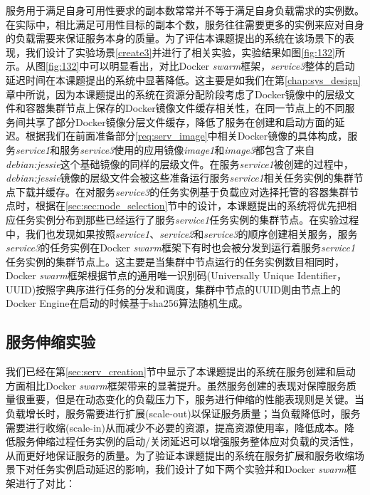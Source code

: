 服务用于满足自身可用性要求的副本数常常并不等于满足自身负载需求的实例数。在实际中，相比满足可用性目标的副本个数，服务往往需要更多的实例来应对自身的负载需要来保证服务本身的质量。为了评估本课题提出的系统在该场景下的表现，我们设计了实验场景\ref{create3}并进行了相关实验，实验结果如图\ref{fig:132}所示。从图\ref{fig:132}中可以明显看出，对比Docker \emph{swarm}框架，\emph{service3}整体的启动延迟时间在本课题提出的系统中显著降低。这主要是如我们在第\ref{chap:sys_design}章中所说，因为本课题提出的系统在资源分配阶段考虑了Docker镜像中的层级文件和容器集群节点上保存的Docker镜像文件缓存相关性，在同一节点上的不同服务间共享了部分Docker镜像分层文件缓存，降低了服务在创建和启动方面的延迟。根据我们在前面准备部分\ref{req:serv_image}中相关Docker镜像的具体构成，服务\emph{service1}和服务\emph{service3}使用的应用镜像\emph{image1}和\emph{image3}都包含了来自\emph{debian:jessie}这个基础镜像的同样的层级文件。在服务\emph{service1}被创建的过程中，\emph{debian:jessie}镜像的层级文件会被这些准备运行服务\emph{service1}相关任务实例的集群节点下载并缓存。在对服务\emph{service3}的任务实例基于负载应对选择托管的容器集群节点时，根据在\ref{sec:sec:node_selection}节中的设计，本课题提出的系统将优先把相应任务实例分布到那些已经运行了服务\emph{service1}任务实例的集群节点。在实验过程中，我们也发现如果按照\emph{service1}、\emph{service2}和\emph{service3}的顺序创建相关服务，服务\emph{service3}的任务实例在Docker \emph{swarm}框架下有时也会被分发到运行着服务\emph{service1}任务实例的集群节点上。这主要是当集群中节点运行的任务实例数目相同时，Docker \emph{swarm}框架根据节点的通用唯一识别码(Universally Unique Identifier，UUID)按照字典序进行任务的分发和调度，集群中节点的UUID则由节点上的Docker Engine在启动的时候基于sha256算法随机生成。

\subsection{服务伸缩实验}\label{sec:serv_scale}
我们已经在第\ref{sec:serv_creation}节中显示了本课题提出的系统在服务创建和启动方面相比Docker \emph{swarm}框架带来的显著提升。虽然服务创建的表现对保障服务质量很重要，但是在动态变化的负载压力下，服务进行伸缩的性能表现则是关键。当负载增长时，服务需要进行扩展(scale-out)以保证服务质量；当负载降低时，服务需要进行收缩(scale-in)从而减少不必要的资源，提高资源使用率，降低成本。降低服务伸缩过程任务实例的启动/关闭延迟可以增强服务整体应对负载的灵活性，从而更好地保证服务的质量。为了验证本课题提出的系统在服务扩展和服务收缩场景下对任务实例启动延迟的影响，我们设计了如下两个实验并和Docker \emph{swarm}框架进行了对比：

